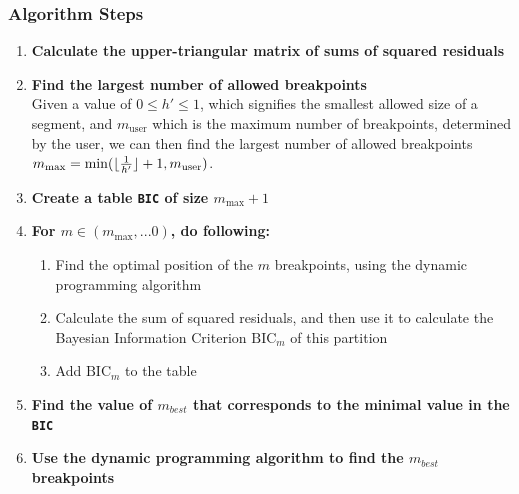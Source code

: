 \documentclass[presentation.tex]{subfiles}
\begin{document}
\begin{frame}
  \frametitle{Algorithm Steps}
  \begin{enumerate}
\item \textbf{Calculate the upper-triangular matrix of sums of squared residuals}
\item \textbf{Find the largest number of allowed breakpoints}\\
  Given a value of $0\leq h' \leq 1$, which signifies the smallest allowed size of
  a segment, and $m_{\text{user}}$ which is the maximum number of breakpoints, determined by the user, 
  we can then find the largest number of allowed
  breakpoints $m_{\text{max}} = \min(\lfloor\frac{1}{h'}\rfloor + 1, m_{\text{user}})$.
\item \textbf{Create a table \texttt{BIC} of size $m_{\text{max}} + 1$}
\item \textbf{For $m \in (m_{\text{max}}, ... 0)$, do following:}
  \begin{enumerate}
  \item Find the optimal position of the $m$ breakpoints, using the dynamic programming algorithm
  \item Calculate the sum of squared residuals, and then use it to
    calculate the Bayesian Information Criterion $\text{BIC}_m$ of this
    partition
  \item Add $\text{BIC}_m$ to the table
  \end{enumerate}
\item \textbf{Find the value of $m_{best}$ that corresponds to the minimal value in the \texttt{BIC}}
\item \textbf{Use the dynamic programming algorithm to find the $m_{best}$ breakpoints}
\end{enumerate}
\end{frame}
\end{document}
